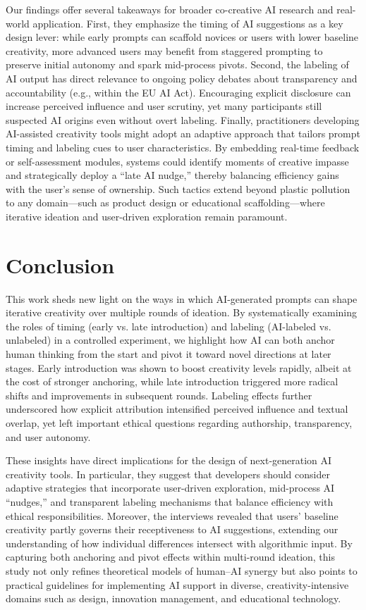 \documentclass{article}
\begin{document}
Our findings offer several takeaways for broader co-creative AI research and real-world application. First, they emphasize the timing of AI suggestions as a key design lever: while early prompts can scaffold novices or users with lower baseline creativity, more advanced users may benefit from staggered prompting to preserve initial autonomy and spark mid-process pivots. Second, the labeling of AI output has direct relevance to ongoing policy debates about transparency and accountability (e.g., within the EU AI Act). Encouraging explicit disclosure can increase perceived influence and user scrutiny, yet many participants still suspected AI origins even without overt labeling. Finally, practitioners developing AI-assisted creativity tools might adopt an adaptive approach that tailors prompt timing and labeling cues to user characteristics. By embedding real-time feedback or self-assessment modules, systems could identify moments of creative impasse and strategically deploy a “late AI nudge,” thereby balancing efficiency gains with the user’s sense of ownership. Such tactics extend beyond plastic pollution to any domain—such as product design or educational scaffolding—where iterative ideation and user-driven exploration remain paramount.

\section{Conclusion}
This work sheds new light on the ways in which AI-generated prompts can shape iterative creativity over multiple rounds of ideation. By systematically examining the roles of timing (early vs. late introduction) and labeling (AI-labeled vs. unlabeled) in a controlled experiment, we highlight how AI can both anchor human thinking from the start and pivot it toward novel directions at later stages. Early introduction was shown to boost creativity levels rapidly, albeit at the cost of stronger anchoring, while late introduction triggered more radical shifts and improvements in subsequent rounds. Labeling effects further underscored how explicit attribution intensified perceived influence and textual overlap, yet left important ethical questions regarding authorship, transparency, and user autonomy.

These insights have direct implications for the design of next-generation AI creativity tools. In particular, they suggest that developers should consider adaptive strategies that incorporate user-driven exploration, mid-process AI “nudges,” and transparent labeling mechanisms that balance efficiency with ethical responsibilities. Moreover, the interviews revealed that users’ baseline creativity partly governs their receptiveness to AI suggestions, extending our understanding of how individual differences intersect with algorithmic input. By capturing both anchoring and pivot effects within multi-round ideation, this study not only refines theoretical models of human–AI synergy but also points to practical guidelines for implementing AI support in diverse, creativity-intensive domains such as design, innovation management, and educational technology.



\end{document}
